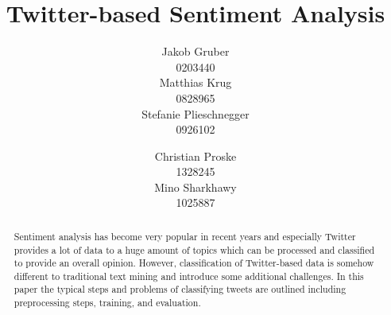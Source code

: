 \documentclass{acm_proc_article-sp}
\begin{document}
\title{Twitter-based Sentiment Analysis}

\author{
\alignauthor Jakob Gruber\\
      0203440\\
       \email{}
\alignauthor Matthias Krug\\
      0828965\\
       \email{}
\alignauthor Stefanie Plieschnegger\\
      0926102\\
\and
\alignauthor Christian Proske\\
         1328245 \\
       \email{}
\alignauthor Mino Sharkhawy \\
      1025887 \\
       \email{}
}

\maketitle
\begin{abstract} Sentiment analysis has become very popular in recent years and
    especially Twitter provides a lot of data to a huge amount of topics which
    can be processed and classified to provide an overall opinion. However,
    classification of Twitter-based data is somehow different to traditional
    text mining and introduce some additional challenges. In this paper the
    typical steps and problems of classifying tweets are outlined including
    preprocessing steps, training, and evaluation.  \end{abstract}



\end{document}
